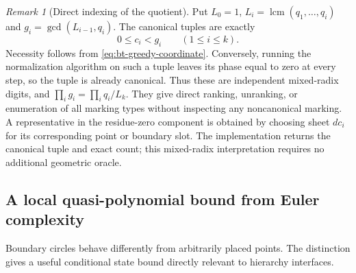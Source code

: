 \documentclass[11pt]{article}
\theoremstyle{definition}
\theoremstyle{remark}
\newtheorem{remark}[theorem]{Remark}
\newcommand{\lcm}{\operatorname{lcm}}
\begin{document}
\begin{remark}[Direct indexing of the quotient]\label{rem:bt-indexing}
Put $L_0=1$, $L_i=\lcm(q_1,\ldots,q_i)$ and
$g_i=\gcd(L_{i-1},q_i)$.  The canonical tuples are exactly
\[
 0\le c_i<g_i\qquad(1\le i\le k).
\]
Necessity follows from \eqref{eq:bt-greedy-coordinate}.  Conversely,
running the normalization algorithm on such a tuple leaves its phase
equal to zero at every step, so the tuple is already canonical.  Thus
these are independent mixed-radix digits, and
$\prod_i g_i=\prod_iq_i/L_k$.  They give direct ranking, unranking, or
enumeration of all marking types without inspecting any noncanonical
marking.  A representative in the residue-zero component is obtained
by choosing sheet $dc_i$ for its corresponding point or boundary slot.
The implementation returns the canonical tuple and exact count; this
mixed-radix interpretation requires no additional geometric oracle.
\end{remark}

\subsection{A local quasi-polynomial bound from Euler complexity}

Boundary circles behave differently from arbitrarily placed points.
The distinction gives a useful conditional state bound directly relevant
to hierarchy interfaces.
\end{document}
